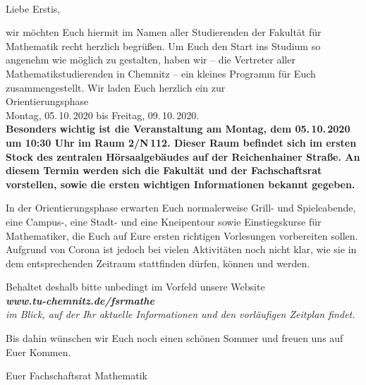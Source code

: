 \documentclass[nkz,einrichtung,usemycontact]{tucletter2019}
\begin{document}
	
\begin{letter}{%
\, \\
}

\opening{Liebe Erstis,}


wir möchten Euch hiermit im Namen aller Studierenden der Fakultät für Mathematik recht herzlich begrüßen.
Um Euch den Start ins Studium so angenehm wie möglich zu gestalten, haben wir -- die Vertreter aller Mathematikstudierenden in Chemnitz -- ein
kleines Programm für Euch zusammengestellt. Wir laden Euch herzlich ein zur \\[16pt]

\hspace*{\fill} \Large Orientierungsphase \hspace*{\fill} \\
\hspace*{\fill} Montag, 05.\,10.\,2020 bis Freitag, 09.\,10.\,2020. \normalsize \hspace*{\fill} \\[20pt]


\bfseries Besonders wichtig ist die Veranstaltung am Montag, dem 05.\,10.\,2020 um 10:30 Uhr im Raum 2/N\,112. Dieser Raum befindet sich im ersten Stock 
des zentralen Hörsaalgebäudes auf der Reichenhainer Straße. An diesem Termin werden sich die Fakultät und der Fachschaftsrat vorstellen, sowie 
die ersten wichtigen Informationen bekannt gegeben.\mdseries

\smallskip

In der Orientierungsphase erwarten Euch normalerweise Grill- und Spieleabende, eine Campus-, eine Stadt- und eine Kneipentour sowie Einstiegskurse für Mathematiker, die Euch auf Eure ersten richtigen Vorlesungen vorbereiten sollen. Aufgrund von Corona ist jedoch bei vielen Aktivitäten noch nicht klar, wie sie in dem entsprechenden Zeitraum stattfinden dürfen, können und werden.

\smallskip

Behaltet deshalb bitte unbedingt im Vorfeld unsere Website \\[8pt]
\hspace*{\fill} \itshape\textbf{www.tu-chemnitz.de/fsrmathe} \upshape \hspace*{\fill} \\[8pt]
im Blick, auf der Ihr aktuelle Informationen und den vorläufigen Zeitplan findet.

\medskip

Bis dahin wünschen wir Euch noch einen schönen Sommer und freuen uns auf Euer Kommen.

\medskip

Euer Fachschaftsrat Mathematik

\end{letter}
\end{document}

